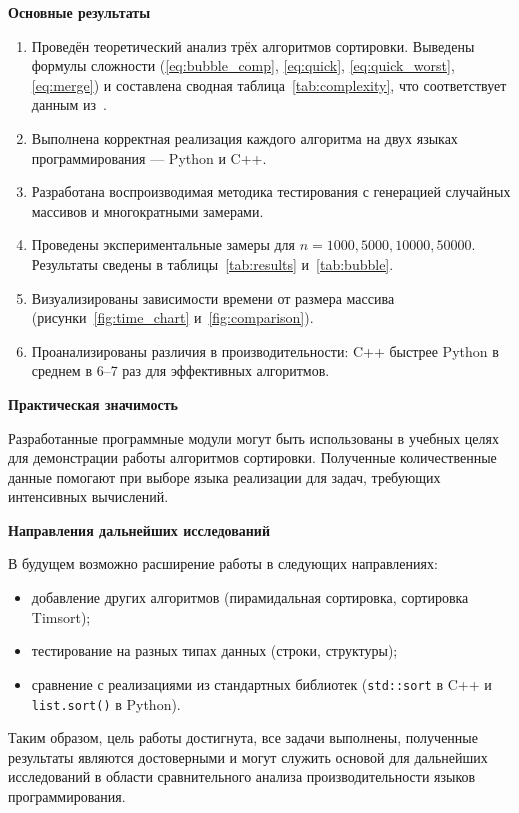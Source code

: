 
\textbf{Основные результаты}

\begin{enumerate}
    \item Проведён теоретический анализ трёх алгоритмов сортировки. Выведены формулы сложности (\ref{eq:bubble_comp}, \ref{eq:quick}, \ref{eq:quick_worst}, \ref{eq:merge}) и составлена сводная таблица~\ref{tab:complexity}, что соответствует данным из~\cite{knuth1998}.
    \item Выполнена корректная реализация каждого алгоритма на двух языках программирования — Python и C++.
    \item Разработана воспроизводимая методика тестирования с генерацией случайных массивов и многократными замерами.
    \item Проведены экспериментальные замеры для $n = 1000, 5000, 10000, 50000$. Результаты сведены в таблицы~\ref{tab:results} и~\ref{tab:bubble}.
    \item Визуализированы зависимости времени от размера массива (рисунки~\ref{fig:time_chart} и~\ref{fig:comparison}).
    \item Проанализированы различия в производительности: C++ быстрее Python в среднем в 6–7 раз для эффективных алгоритмов.
\end{enumerate}

\textbf{Практическая значимость}

Разработанные программные модули могут быть использованы в учебных целях для демонстрации работы алгоритмов сортировки. Полученные количественные данные помогают при выборе языка реализации для задач, требующих интенсивных вычислений.

\textbf{Направления дальнейших исследований}

В будущем возможно расширение работы в следующих направлениях:
\begin{itemize}
    \item добавление других алгоритмов (пирамидальная сортировка, сортировка Timsort);
    \item тестирование на разных типах данных (строки, структуры);
    \item сравнение с реализациями из стандартных библиотек (\texttt{std::sort} в C++ и \texttt{list.sort()} в Python).
\end{itemize}

Таким образом, цель работы достигнута, все задачи выполнены, полученные результаты являются достоверными и могут служить основой для дальнейших исследований в области сравнительного анализа производительности языков программирования.